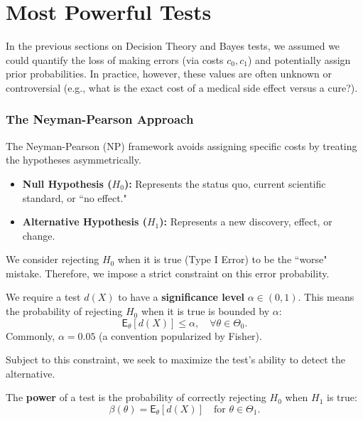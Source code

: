 \section{Most Powerful Tests}
\label{sec:most_powerful_tests}

In the previous sections on Decision Theory and Bayes tests, we assumed we could quantify the loss of making errors (via costs $c_0, c_1$) and potentially assign prior probabilities. In practice, however, these values are often unknown or controversial (e.g., what is the exact cost of a medical side effect versus a cure?).

\subsubsection{The Neyman-Pearson Approach}
The Neyman-Pearson (NP) framework avoids assigning specific costs by treating the hypotheses asymmetrically. 
\begin{itemize}
    \item \textbf{Null Hypothesis ($H_0$):} Represents the status quo, current scientific standard, or ``no effect."
    \item \textbf{Alternative Hypothesis ($H_1$):} Represents a new discovery, effect, or change.
\end{itemize}

We consider rejecting $H_0$ when it is true (Type I Error) to be the ``worse" mistake. Therefore, we impose a strict constraint on this error probability.


\begin{definition}
We require a test $d(X)$ to have a \textbf{significance level} $\alpha \in (0, 1)$. This means the probability of rejecting $H_0$ when it is true is bounded by $\alpha$:
\[
\mathsf{E}_{\theta}[d(X)] \le \alpha, \quad \forall \theta \in \Theta_0.
\]
Commonly, $\alpha = 0.05$ (a convention popularized by Fisher).
\end{definition}



Subject to this constraint, we seek to maximize the test's ability to detect the alternative.

\begin{definition}[Power]
The \textbf{power} of a test is the probability of correctly rejecting $H_0$ when $H_1$ is true:
\[
\beta(\theta) = \mathsf{E}_{\theta}[d(X)] \quad \text{for } \theta \in \Theta_1.
\]
\end{definition}

